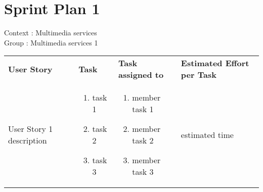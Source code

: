 \documentclass[11pt,a4paper]{article}
\begin{document}
\section*{Sprint Plan 1}
Context : Multimedia services\\
Group : Multimedia services 1\\



\begin{table}[h]
\begin{tabular}{|p{6cm}|p{5.5cm}|p{4cm}|p{3cm}|}
\textbf{User Story} & \textbf{Task} & \textbf{Task assigned to} & \textbf{Estimated Effort per Task} \\
User Story 1 description & \begin{enumerate}
\item task 1
\item task 2
\item task 3
\end{enumerate}

& 
\begin{enumerate}
\item member task 1
\item member task 2
\item member task 3
\end{enumerate}

& 
estimated time \\

           
\end{tabular}
\end{table}
\end{document}
